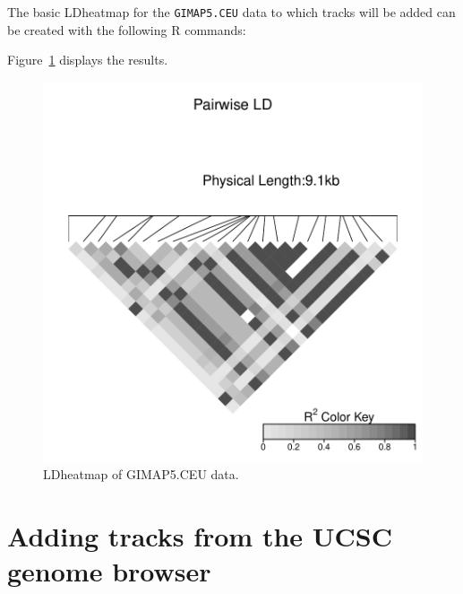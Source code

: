 \documentclass{article}
\begin{document}
The basic LDheatmap for the \texttt{GIMAP5.CEU}
data to which tracks will be added can be created with the following 
R commands:
\begin{Schunk}
\end{Schunk}
Figure~\ref{fig:fig1} displays the results.
\begin{figure}
\begin{center}
\includegraphics{addTracks-fig1}
\end{center}
\caption{LDheatmap of GIMAP5.CEU data.}
\label{fig:fig1}
\end{figure}

\section{Adding tracks from the UCSC genome browser}
\end{document}
